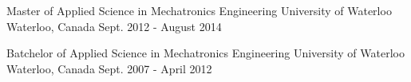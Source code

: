 \documentclass[11pt, a4paper]{awesome-cv}
\begin{document}

\begin{cventries}

  \cventry
    {Master of Applied Science in Mechatronics Engineering} %
    {University of Waterloo} %
    {Waterloo, Canada} %
    {Sept. 2012 - August 2014} %
    {
    }

\vspace{-4mm}
  \cventry
    {Batchelor of Applied Science in Mechatronics Engineering} %
    {University of Waterloo} %
    {Waterloo, Canada} %
    {Sept. 2007 - April 2012} %
    {}

\end{cventries}




\vspace{-3mm}

\vspace{-6mm}
\vspace{-6mm}


%
%
%
% 
% 
% 
%
% 


\end{document}
